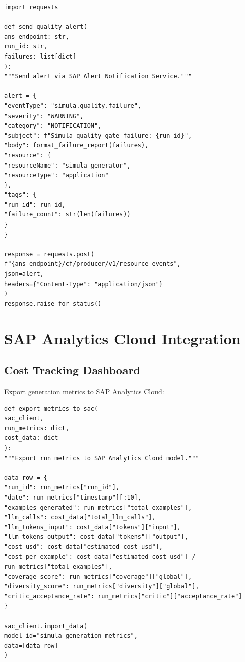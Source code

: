 \documentclass[12pt,a4paper,twoside]{report}
\begin{document}
\begin{lstlisting}[language=jsonx,caption={Alert notification for quality failures}]
import requests

def send_quality_alert(
ans_endpoint: str,
run_id: str,
failures: list[dict]
):
"""Send alert via SAP Alert Notification Service."""

alert = {
"eventType": "simula.quality.failure",
"severity": "WARNING",
"category": "NOTIFICATION",
"subject": f"Simula quality gate failure: {run_id}",
"body": format_failure_report(failures),
"resource": {
"resourceName": "simula-generator",
"resourceType": "application"
},
"tags": {
"run_id": run_id,
"failure_count": str(len(failures))
}
}

response = requests.post(
f"{ans_endpoint}/cf/producer/v1/resource-events",
json=alert,
headers={"Content-Type": "application/json"}
)
response.raise_for_status()
\end{lstlisting}


\section{SAP Analytics Cloud Integration}

\subsection{Cost Tracking Dashboard}

Export generation metrics to SAP Analytics Cloud:

\begin{lstlisting}[language=jsonx,caption={Exporting metrics to Analytics Cloud}]
def export_metrics_to_sac(
sac_client,
run_metrics: dict,
cost_data: dict
):
"""Export run metrics to SAP Analytics Cloud model."""

data_row = {
"run_id": run_metrics["run_id"],
"date": run_metrics["timestamp"][:10],
"examples_generated": run_metrics["total_examples"],
"llm_calls": cost_data["total_llm_calls"],
"llm_tokens_input": cost_data["tokens"]["input"],
"llm_tokens_output": cost_data["tokens"]["output"],
"cost_usd": cost_data["estimated_cost_usd"],
"cost_per_example": cost_data["estimated_cost_usd"] / run_metrics["total_examples"],
"coverage_score": run_metrics["coverage"]["global"],
"diversity_score": run_metrics["diversity"]["global"],
"critic_acceptance_rate": run_metrics["critic"]["acceptance_rate"]
}

sac_client.import_data(
model_id="simula_generation_metrics",
data=[data_row]
)
\end{lstlisting}
\end{document}
